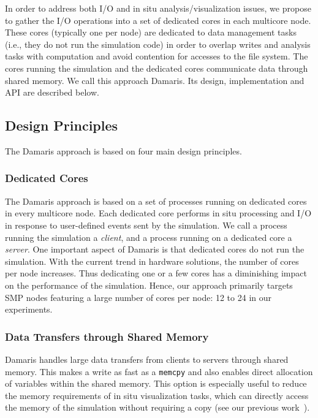 In order to address both I/O and in situ analysis/visualization issues,
we propose to gather the I/O operations into a set of dedicated cores in each
multicore node. These cores (typically one per node)
are dedicated to data management tasks (i.e., they do not run the simulation code) in order
to overlap writes and analysis tasks with computation and avoid contention for accesses
to the file system. The cores running the simulation
and the dedicated cores communicate data through shared memory.
We call this approach Damaris. Its design, implementation and API are described below.

\subsection{Design Principles}

The Damaris approach is based on four main design principles.

\subsubsection{Dedicated Cores}

The Damaris approach is based on a set of processes running on dedicated cores in every multicore node.
Each dedicated core performs in situ processing and I/O in response to user-defined events sent by the simulation.
We call a process running the simulation a \emph{client}, and a process running on a dedicated core a \emph{server}.
One important aspect of Damaris is that dedicated cores do not run the simulation.
With the current trend in hardware solutions, the number of cores per node increases.
Thus dedicating one or a few cores has a diminishing impact on the performance of the simulation. 
Hence, our approach primarily targets SMP nodes featuring a large number of cores per node: 12 to 24 in our experiments.

\subsubsection{Data Transfers through Shared Memory}

Damaris handles large data transfers from clients to servers through shared memory.
This makes a write as fast as a \texttt{memcpy} and also enables direct allocation of
variables within the shared memory. This option is especially useful to reduce the
memory requirements of in situ visualization tasks, which can directly access the memory
of the simulation without requiring a copy (see our previous work~\cite{dorier2013damarisviz}).

